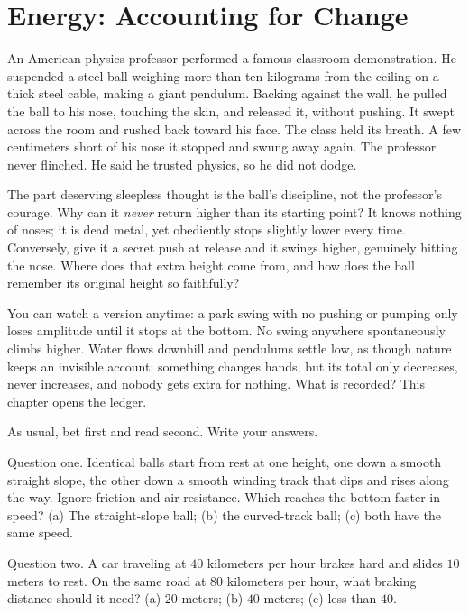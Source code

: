 \chapter{Energy: Accounting for Change}


\begin{mainline}
An American physics professor performed a famous classroom demonstration. He suspended a steel ball weighing more than ten kilograms from the ceiling on a thick steel cable, making a giant pendulum. Backing against the wall, he pulled the ball to his nose, touching the skin, and released it, without pushing. It swept across the room and rushed back toward his face. The class held its breath. A few centimeters short of his nose it stopped and swung away again. The professor never flinched. He said he trusted physics, so he did not dodge.

The part deserving sleepless thought is the ball's discipline, not the professor's courage. Why can it \emph{never} return higher than its starting point? It knows nothing of noses; it is dead metal, yet obediently stops slightly lower every time. Conversely, give it a secret push at release and it swings higher, genuinely hitting the nose. Where does that extra height come from, and how does the ball remember its original height so faithfully?

You can watch a version anytime: a park swing with no pushing or pumping only loses amplitude until it stops at the bottom. No swing anywhere spontaneously climbs higher. Water flows downhill and pendulums settle low, as though nature keeps an invisible account: something changes hands, but its total only decreases, never increases, and nobody gets extra for nothing. What is recorded? This chapter opens the ledger.
\end{mainline}


As usual, bet first and read second. Write your answers.

Question one. Identical balls start from rest at one height, one down a smooth straight slope, the other down a smooth winding track that dips and rises along the way. Ignore friction and air resistance. Which reaches the bottom faster in speed? (a) The straight-slope ball; (b) the curved-track ball; (c) both have the same speed.

Question two. A car traveling at \(40\) kilometers per hour brakes hard and slides \(10\) meters to rest. On the same road at \(80\) kilometers per hour, what braking distance should it need? (a) \(20\) meters; (b) \(40\) meters; (c) less than \(40\).

